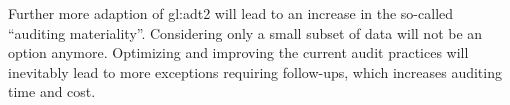 Further more adaption of \gls{gl:adt2} will lead to an increase in the so-called “auditing materiality”. Considering only a small subset of data will not be an option anymore. Optimizing and improving the current audit practices will inevitably lead to more exceptions requiring follow-ups, which increases auditing time and cost.

